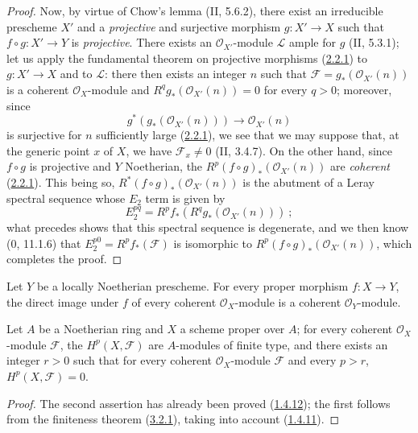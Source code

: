 \begin{proof}
Now, by virtue of Chow's lemma (II, 5.6.2), there exist an irreducible
prescheme $X'$ and a \emph{projective} and surjective morphism
$g:X'\to X$ such that $f\circ g:X'\to Y$ is \emph{projective}. There exists an
$\mathcal O_{X'}$-module $\mathcal L$ ample for $g$ (II, 5.3.1);
let us apply the fundamental theorem on projective morphisms
(\hyperref[III.2.2.1]{2.2.1}) to $g:X'\to X$ and to $\mathcal L$: there
then exists an integer $n$ such that
$\mathcal F=g_*(\mathcal O_{X'}(n))$ is a coherent $\mathcal O_X$-module
and $R^qg_*(\mathcal O_{X'}(n))=0$ for every $q>0$; moreover, since
\[
g^*(g_*(\mathcal O_{X'}(n)))\longrightarrow\mathcal O_{X'}(n)
\]
is surjective for $n$ sufficiently large (\hyperref[III.2.2.1]{2.2.1}), we
see that we may suppose that, at the generic point $x$ of $X$, we have
$\mathcal F_x\neq0$ (II, 3.4.7). On the other hand, since $f\circ g$ is
projective and $Y$ Noetherian, the
$R^p(f\circ g)_*(\mathcal O_{X'}(n))$ are \emph{coherent}
(\hyperref[III.2.2.1]{2.2.1}). This being so,
$R^*(f\circ g)_*(\mathcal O_{X'}(n))$ is the abutment of a Leray spectral
sequence whose $E_2$ term is given by
\[
E_2^{pq}=R^pf_*(R^qg_*(\mathcal O_{X'}(n)))~;
\]
what precedes shows that this spectral sequence is degenerate, and we then
know (0, 11.1.6) that $E_2^{p0}=R^pf_*(\mathcal F)$ is isomorphic to
$R^p(f\circ g)_*(\mathcal O_{X'}(n))$, which completes the proof.
\end{proof}

\begin{corollary}[3.2.2]
\label{III.3.2.2}
Let $Y$ be a locally Noetherian prescheme. For every proper morphism
$f:X\to Y$, the direct image under $f$ of every coherent $\mathcal O_X$-module
is a coherent $\mathcal O_Y$-module.
\end{corollary}

\begin{corollary}[3.2.3]
\label{III.3.2.3}
Let $A$ be a Noetherian ring and $X$ a scheme proper over $A$; for every
coherent $\mathcal O_X$-module $\mathcal F$, the $H^p(X,\mathcal F)$ are
$A$-modules of finite type, and there exists an integer $r>0$ such that for every
coherent $\mathcal O_X$-module $\mathcal F$ and every $p>r$,
$H^p(X,\mathcal F)=0$.
\end{corollary}

\begin{proof}
The second assertion has already been proved
(\hyperref[III.1.4.12]{1.4.12}); the first follows from the finiteness
theorem (\hyperref[III.3.2.1]{3.2.1}), taking into account
(\hyperref[III.1.4.11]{1.4.11}).
\end{proof}

